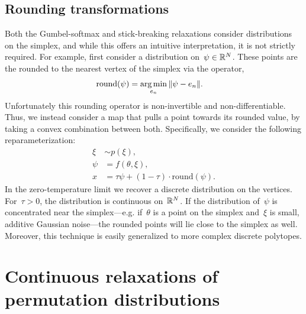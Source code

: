 \documentclass[twoside]{article}
\begin{document}
\subsection{Rounding transformations}
Both the Gumbel-softmax and stick-breaking relaxations consider
distributions on the simplex, and while this
offers an intuitive interpretation, it is not strictly required.  For
example, first consider a distribution on~$\psi \in \mathbb{R}^N$. These
points are the rounded to the nearest vertex of the simplex via the
operator,
\begin{align}
  \mathrm{round}(\psi) &= \argmin_{e_n} \| \psi - e_n \|.
\end{align}
Unfortunately this rounding operator is non-invertible and
non-differentiable.  Thus, we instead consider a map that pulls a
point towards its rounded value, by taking a convex combination
between both. Specifically, we consider the following reparameterization:
\begin{align}
  \xi &\sim p(\xi), \\
  \psi &= f(\theta, \xi), \\
  x &=  \tau \psi + (1-\tau) \cdot \mathrm{round}(\psi) .
\end{align}
In the zero-temperature limit we recover a discrete distribution on
the vertices. For~$\tau > 0$, the distribution is continuous
on~$\mathbb{R}^N$. If the distribution of~$\psi$ is concentrated
near the simplex---e.g. if~$\theta$ is a point on the simplex
and~$\xi$ is small, additive Gaussian noise---the rounded points
will lie close to the simplex as well. Moreover, this technique
is easily generalized to more complex discrete polytopes. 
 
\section{Continuous relaxations of permutation distributions}
\label{sec:permutation}
\end{document}
